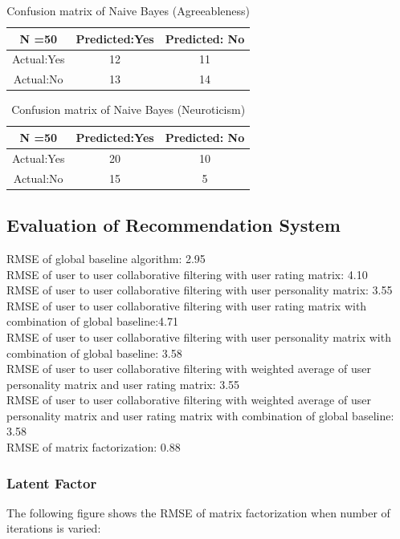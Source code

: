 \begin{table}[!ht]
\centering
\begin{tabular}{ |c|c|c| }
 \hline
 N =50 & Predicted:Yes & Predicted: No \\
 \hline
 Actual:Yes&12 & 11 \\
 \hline
 Actual:No&13 & 14 \\
 \hline
\end{tabular}
 \caption{Confusion matrix of Naive Bayes (Agreeableness)}
\end{table}

\begin{table}[!ht]
\centering
\begin{tabular}{ |c|c|c| }
 \hline
 N =50 & Predicted:Yes & Predicted: No \\
 \hline
 Actual:Yes&20 & 10 \\
 \hline
 Actual:No&15 & 5 \\
 \hline
\end{tabular}
 \caption{Confusion matrix of Naive Bayes (Neuroticism)}
\end{table}


\subsection{Evaluation of Recommendation System}
RMSE of global baseline algorithm: 2.95\\
RMSE of user to user collaborative filtering with user rating matrix: 4.10\\
RMSE of user to user collaborative filtering with user personality matrix: 3.55\\
RMSE of user to user collaborative filtering with user rating matrix with combination of global baseline:4.71 \\
RMSE of user to user collaborative filtering with user personality matrix with combination of global baseline: 3.58\\
RMSE of user to user collaborative filtering with weighted average of user personality matrix and user rating matrix: 3.55\\
RMSE of user to user collaborative filtering with weighted average of user personality matrix and user rating matrix with combination of global baseline: 3.58\\
RMSE of matrix factorization: 0.88\\



\subsubsection{Latent Factor}
The following figure shows the RMSE of matrix factorization when number of iterations is varied:

